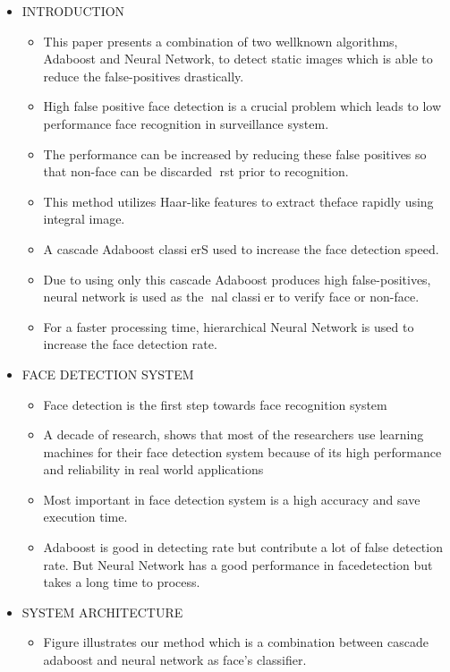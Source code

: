 \documentclass[10pt,a4paper,twoside]{report}
\begin{document}
\begin{appendix}
\begin{enumerate}
\begin{center}
\end{center}

\begin{itemize}
\item INTRODUCTION
\begin{itemize}
\item This paper presents a combination of two wellknown algorithms, Adaboost
and Neural Network, to detect static images which is able to reduce the
false-positives drastically.
\item High false positive face detection is a crucial problem which leads to low
performance face recognition in surveillance system.
\item The performance can be increased by reducing these false positives so that
non-face can be discarded rst prior to recognition.
\item This method utilizes Haar-like features to extract theface rapidly using
integral image.
\item A cascade Adaboost classierS used to increase the face detection speed.
\item Due to using only this cascade Adaboost produces high false-positives, neural
network is used as the nal classier to verify face or non-face.
\item For a faster processing time, hierarchical Neural Network is used to increase
the face detection rate.
\end{itemize}
\item FACE DETECTION SYSTEM
\begin{itemize}
\item Face detection is the first step towards face recognition system
\item A decade of research, shows that most of the researchers use learning
machines for their face detection system because of its high performance and
reliability in real world applications
\item Most important in face detection system is a high accuracy and save
execution time.
\item Adaboost is good in detecting rate but contribute a lot of false detection rate.
But Neural Network has a good performance in facedetection but takes a
long time to process.
\end{itemize}
\item	SYSTEM ARCHITECTURE
\begin{itemize}
\item Figure illustrates our method which is a combination between cascade
adaboost and neural network as face's classifier.
\end{itemize}


\end{itemize}
\end{enumerate}
\end{appendix}
\end{document}

